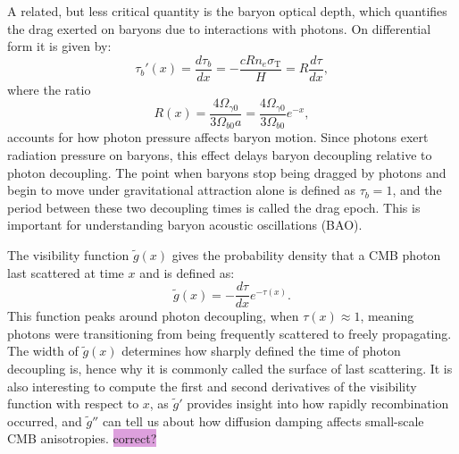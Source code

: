 \documentclass{aa}
\numberwithin{equation}{section}
\numberwithin{table}{section}
\numberwithin{figure}{section}
\begin{document}

A related, but less critical quantity is the baryon optical depth, which quantifies the drag exerted on baryons due to interactions with photons. On differential form it is given by:
\begin{equation}
\tau_b'(x) = \frac{d\tau_b}{dx} = -\frac{c Rn_e \sigma_\text{T}}{H} = R\frac{d\tau}{dx},
\end{equation}
where the ratio
\begin{equation}
  R(x) = \frac{4\Omega_{\gamma0}}{3\Omega_{b0}a} = \frac{4\Omega_{\gamma0}}{3\Omega_{b0}}e^{-x}, \label{eq: R}
\end{equation}
accounts for how photon pressure affects baryon motion. Since photons exert radiation pressure on baryons, this effect delays baryon decoupling relative to photon decoupling. The point when baryons stop being dragged by photons and begin to move under gravitational attraction alone is defined as $\tau_b=1$, and the period between these two decoupling times is called the drag epoch. This is important for understanding baryon acoustic oscillations (BAO). 

The visibility function $\tilde{g}(x)$ gives the probability density that a CMB photon last scattered at time $x$ and is defined as:
\begin{equation}
\tilde{g}(x) = -\frac{d\tau}{dx} e^{-\tau(x)}.
\end{equation}
This function peaks around photon decoupling, when $\tau(x) \approx 1$, meaning photons were transitioning from being frequently scattered to freely propagating. The width of $\tilde{g}(x)$ determines how sharply defined the time of photon decoupling is, hence why it is commonly called the surface of last scattering. It is also interesting to compute the first and second derivatives of the visibility function with respect to $x$, as $\tilde{g}'$ provides insight into how rapidly recombination occurred, and $\tilde{g}''$ can tell us about how diffusion damping affects small-scale CMB anisotropies. \colorbox{Plum}{correct?}
\end{document}
